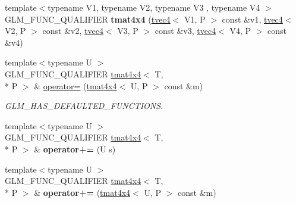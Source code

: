 \begin{DoxyCompactItemize}
\item 
\hypertarget{structglm_1_1tmat4x4_ac1a85b66f907df34234fa6860cfa2cf1}{{\footnotesize template$<$typename V1, typename V2, typename V3 , typename V4 $>$ }\\G\-L\-M\-\_\-\-F\-U\-N\-C\-\_\-\-Q\-U\-A\-L\-I\-F\-I\-E\-R {\bfseries tmat4x4} (\hyperlink{structglm_1_1tvec4}{tvec4}$<$ V1, P $>$ const \&v1, \hyperlink{structglm_1_1tvec4}{tvec4}$<$ V2, P $>$ const \&v2, \hyperlink{structglm_1_1tvec4}{tvec4}$<$ V3, P $>$ const \&v3, \hyperlink{structglm_1_1tvec4}{tvec4}$<$ V4, P $>$ const \&v4)}\label{structglm_1_1tmat4x4_ac1a85b66f907df34234fa6860cfa2cf1}

\item 
\hypertarget{structglm_1_1tmat4x4_a967c1c1711875b670d5a325d86566209}{{\footnotesize template$<$typename U $>$ }\\G\-L\-M\-\_\-\-F\-U\-N\-C\-\_\-\-Q\-U\-A\-L\-I\-F\-I\-E\-R \hyperlink{structglm_1_1tmat4x4}{tmat4x4}$<$ T, \\*
P $>$ \& \hyperlink{structglm_1_1tmat4x4_a967c1c1711875b670d5a325d86566209}{operator=} (\hyperlink{structglm_1_1tmat4x4}{tmat4x4}$<$ U, P $>$ const \&m)}\label{structglm_1_1tmat4x4_a967c1c1711875b670d5a325d86566209}

\begin{DoxyCompactList}\small\item\em G\-L\-M\-\_\-\-H\-A\-S\-\_\-\-D\-E\-F\-A\-U\-L\-T\-E\-D\-\_\-\-F\-U\-N\-C\-T\-I\-O\-N\-S. \end{DoxyCompactList}\item 
\hypertarget{structglm_1_1tmat4x4_aef40b6c6931ba950e9414bc82e5ee0ed}{{\footnotesize template$<$typename U $>$ }\\G\-L\-M\-\_\-\-F\-U\-N\-C\-\_\-\-Q\-U\-A\-L\-I\-F\-I\-E\-R \hyperlink{structglm_1_1tmat4x4}{tmat4x4}$<$ T, \\*
P $>$ \& {\bfseries operator+=} (U s)}\label{structglm_1_1tmat4x4_aef40b6c6931ba950e9414bc82e5ee0ed}

\item 
\hypertarget{structglm_1_1tmat4x4_a6d28df7c71f90ad3c2d021e9e11eff4a}{{\footnotesize template$<$typename U $>$ }\\G\-L\-M\-\_\-\-F\-U\-N\-C\-\_\-\-Q\-U\-A\-L\-I\-F\-I\-E\-R \hyperlink{structglm_1_1tmat4x4}{tmat4x4}$<$ T, \\*
P $>$ \& {\bfseries operator+=} (\hyperlink{structglm_1_1tmat4x4}{tmat4x4}$<$ U, P $>$ const \&m)}\label{structglm_1_1tmat4x4_a6d28df7c71f90ad3c2d021e9e11eff4a}


\end{DoxyCompactItemize}
